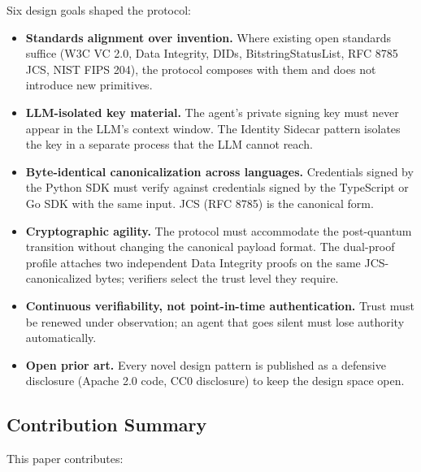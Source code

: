 \documentclass[11pt,a4paper,twocolumn]{article}
\begin{document}
Six design goals shaped the protocol:

\begin{itemize}[leftmargin=*]
\item \textbf{Standards alignment over invention.} Where existing open standards suffice (W3C VC 2.0, Data Integrity, DIDs, BitstringStatusList, RFC 8785 JCS, NIST FIPS 204), the protocol composes with them and does not introduce new primitives.
\item \textbf{LLM-isolated key material.} The agent's private signing key must never appear in the LLM's context window. The Identity Sidecar pattern isolates the key in a separate process that the LLM cannot reach.
\item \textbf{Byte-identical canonicalization across languages.} Credentials signed by the Python SDK must verify against credentials signed by the TypeScript or Go SDK with the same input. JCS (RFC 8785) is the canonical form.
\item \textbf{Cryptographic agility.} The protocol must accommodate the post-quantum transition without changing the canonical payload format. The dual-proof profile attaches two independent Data Integrity proofs on the same JCS-canonicalized bytes; verifiers select the trust level they require.
\item \textbf{Continuous verifiability, not point-in-time authentication.} Trust must be renewed under observation; an agent that goes silent must lose authority automatically.
\item \textbf{Open prior art.} Every novel design pattern is published as a defensive disclosure (Apache 2.0 code, CC0 disclosure) to keep the design space open.
\end{itemize}

\subsection{Contribution Summary}

This paper contributes:
\end{document}
